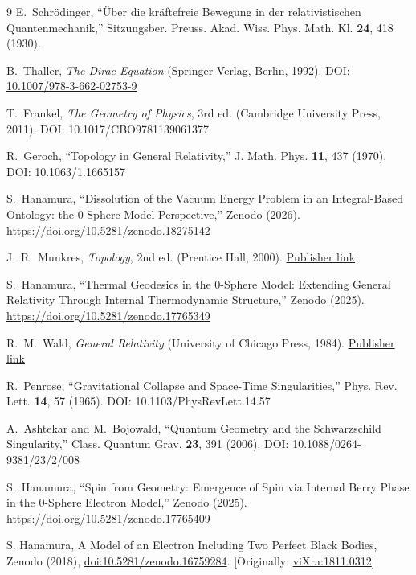 \documentclass[%
 reprint,
 amsmath,amssymb,
 aps,
 prb,
]{revtex4-2}
\numberwithin{equation}{section}
\begin{document}
\begin{thebibliography}{9}
E.~Schrödinger,
``Über die kräftefreie Bewegung in der relativistischen Quantenmechanik,''
Sitzungsber. Preuss. Akad. Wiss. Phys. Math. Kl. \textbf{24}, 418 (1930).

B.~Thaller,
\textit{The Dirac Equation}
(Springer-Verlag, Berlin, 1992).
\href{https://doi.org/10.1007/978-3-662-02753-9}{DOI: 10.1007/978-3-662-02753-9}

T.~Frankel,
\textit{The Geometry of Physics},
3rd ed. (Cambridge University Press, 2011).  
DOI: 10.1017/CBO9781139061377

R.~Geroch,
``Topology in General Relativity,''
J. Math. Phys. \textbf{11}, 437 (1970).  
DOI: 10.1063/1.1665157

S.~Hanamura, ``Dissolution of the Vacuum Energy Problem in an Integral-Based Ontology: the 0-Sphere Model Perspective,'' Zenodo (2026). \href{https://doi.org/10.5281/zenodo.18275142}{https://doi.org/10.5281/zenodo.18275142}

J.~R.~Munkres,
\textit{Topology},
2nd ed. (Prentice Hall, 2000).  
\href{https://www.pearson.com/en-us/subject-catalog/p/topology/P200000003295}{Publisher link}

S.~Hanamura, ``Thermal Geodesics in the 0-Sphere Model: Extending General Relativity Through Internal Thermodynamic Structure,'' Zenodo (2025). \href{https://doi.org/10.5281/zenodo.17765349}{https://doi.org/10.5281/zenodo.17765349}

R.~M.~Wald,
\textit{General Relativity}
(University of Chicago Press, 1984).  
\href{https://press.uchicago.edu/ucp/books/book/chicago/G/bo3684313.html}{Publisher link}

R.~Penrose,
``Gravitational Collapse and Space-Time Singularities,''
Phys. Rev. Lett. \textbf{14}, 57 (1965).  
DOI: 10.1103/PhysRevLett.14.57

A.~Ashtekar and M.~Bojowald,
``Quantum Geometry and the Schwarzschild Singularity,''
Class. Quantum Grav. \textbf{23}, 391 (2006).  
DOI: 10.1088/0264-9381/23/2/008

S.~Hanamura, ``Spin from Geometry: Emergence of Spin via Internal Berry Phase in the 0-Sphere Electron Model,'' Zenodo (2025). \href{https://doi.org/10.5281/zenodo.17765409}{https://doi.org/10.5281/zenodo.17765409}

S. Hanamura, A Model of an Electron Including Two Perfect Black Bodies, Zenodo (2018), \href{https://doi.org/10.5281/zenodo.16759284}{doi:10.5281/zenodo.16759284}. [Originally: \href{https://vixra.org/abs/1811.0312}{viXra:1811.0312}]


\end{thebibliography}
\end{document}
